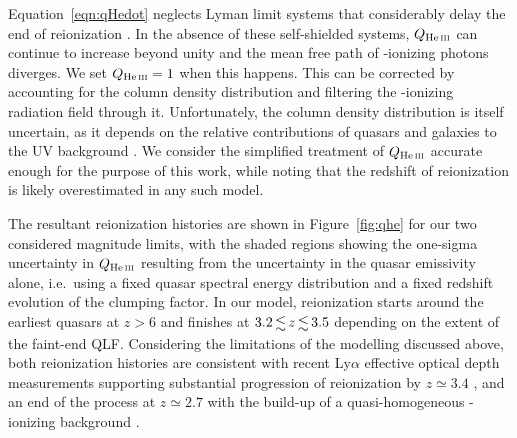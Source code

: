 \documentclass[fleqn,usenatbib]{mnras}
\begin{document}
Equation~\eqref{eqn:qHedot} neglects  Lyman limit systems
that considerably delay the end of  reionization \citep{2009MNRAS.395..736B, 2017ApJ...851...50M}.
In the absence of these self-shielded systems, $Q_\ion{He}{iii}$ can continue
to increase beyond unity and the mean free path of -ionizing photons diverges.
We set $Q_\ion{He}{iii}=1$ when this happens.
This can be corrected by accounting for the  column
density distribution and filtering the -ionizing radiation
field through it. Unfortunately, the  column density
distribution is itself uncertain, as it depends on the
relative contributions of quasars and galaxies to the UV background \citep[e.g.][]{2012ApJ...746..125H,2018arXiv180104931P}. 
We consider the simplified treatment of $Q_\ion{He}{iii}$ accurate enough for the purpose
of this work, while noting that the redshift of  reionization is
likely overestimated in any such model.

The resultant  reionization histories are shown in Figure~\ref{fig:qhe}
for our two considered magnitude limits, with the shaded regions showing the one-sigma
uncertainty in $Q_\ion{He}{iii}$ resulting from the uncertainty in the quasar emissivity alone,
i.e.\ using a fixed quasar spectral energy distribution and a fixed redshift evolution of the clumping factor.
In our model,  reionization starts around the earliest quasars at $z>6$ and finishes at
$3.2\la z\la 3.5$ depending on the extent of the faint-end QLF.
Considering the limitations of the modelling discussed above, both  reionization histories
are consistent with recent  Ly$\alpha$ effective optical depth measurements supporting
substantial progression of  reionization by $z\simeq 3.4$ \citep{2016ApJ...825..144W},
and an end of the process at $z\simeq 2.7$ \citep{2011ApJ...733L..24W,2016ApJ...825..144W}
with the build-up of a quasi-homogeneous -ionizing background \citep{2014MNRAS.437.1141D,2017MNRAS.465.2886D}. 

\end{document}
